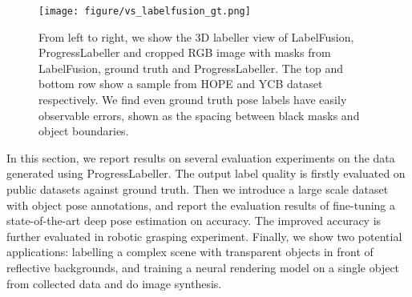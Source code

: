 \begin{figure*}[htbp]
     \centering
     \texttt{[image: figure/vs\_labelfusion\_gt.png]}
     \caption{From left to right, we show the 3D labeller view of LabelFusion, ProgressLabeller and cropped RGB image with masks from LabelFusion, ground truth and ProgressLabeller. The top and bottom row show a sample from HOPE and YCB dataset respectively. We find even ground truth pose labels have easily observable errors, shown as the spacing between black masks and object boundaries.}
     \label{fig:compare_label}
 \end{figure*}

In this section, we report results on several evaluation experiments on the data generated using ProgressLabeller. The output label quality is firstly evaluated on public datasets against ground truth. Then we introduce a large scale dataset with object pose annotations, and report the evaluation results of fine-tuning a state-of-the-art deep pose estimation on accuracy. The improved accuracy is further evaluated in robotic grasping experiment. Finally, we show two potential applications: labelling a complex scene with transparent objects in front of reflective backgrounds, and training a neural rendering model on a single object from collected data and do image synthesis.

